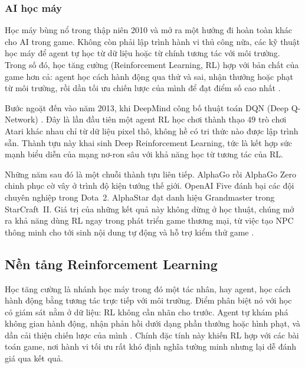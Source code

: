 \subsubsection{AI học máy}
\indent Học máy bùng nổ trong thập niên 2010 và mở ra một hướng đi hoàn toàn khác cho AI
trong game. Không còn phải lập trình hành vi thủ công nữa, các kỹ thuật học máy để agent
tự học từ dữ liệu hoặc từ chính tương tác với môi trường. Trong số đó, học tăng cường
(Reinforcement Learning, RL) hợp với bản chất của game hơn cả: agent học cách hành động
qua thử và sai, nhận thưởng hoặc phạt từ môi trường, rồi dần tối ưu chiến lược của mình
để đạt điểm số cao nhất \cite{sutton2018reinforcement}.

\indent Bước ngoặt đến vào năm 2013, khi DeepMind công bố thuật toán DQN (Deep Q-Network)
\cite{mnih2015humanlevel}. Đây là lần đầu tiên một agent RL học chơi thành thạo $49$ trò
chơi Atari khác nhau chỉ từ dữ liệu pixel thô, không hề có tri thức nào được lập trình
sẵn. Thành tựu này khai sinh Deep Reinforcement Learning, tức là kết hợp sức mạnh biểu
diễn của mạng nơ-ron sâu với khả năng học từ tương tác của RL.

\indent Những năm sau đó là một chuỗi thành tựu liên tiếp. AlphaGo rồi AlphaGo Zero
\cite{silver2016mastering, silver2017mastering} chinh phục cờ vây ở trình độ kiện tướng
thế giới. OpenAI Five \cite{openai2019dota} đánh bại các đội chuyên nghiệp trong Dota~2.
AlphaStar \cite{vinyals2019grandmaster} đạt danh hiệu Grandmaster trong StarCraft~II.
Giá trị của những kết quả này không dừng ở học thuật, chúng mở ra khả năng dùng RL ngay
trong phát triển game thương mại, từ việc tạo NPC thông minh cho tới sinh nội dung tự
động và hỗ trợ kiểm thử game \cite{yannakakis2018artificial}.

\subsection{Nền tảng Reinforcement Learning}

\indent Học tăng cường là nhánh học máy trong đó một tác
nhân, hay agent, học cách hành động bằng tương tác trực tiếp với môi trường. Điểm phân
biệt nó với học có giám sát nằm ở dữ liệu: RL không cần nhãn cho trước. Agent tự khám phá
không gian hành động, nhận phản hồi dưới dạng phần thưởng hoặc hình phạt, và dần cải
thiện chiến lược của mình \cite{sutton2018reinforcement}. Chính đặc tính này khiến RL hợp
với các bài toán game, nơi hành vi tối ưu rất khó định nghĩa tường minh nhưng lại dễ đánh
giá qua kết quả.

